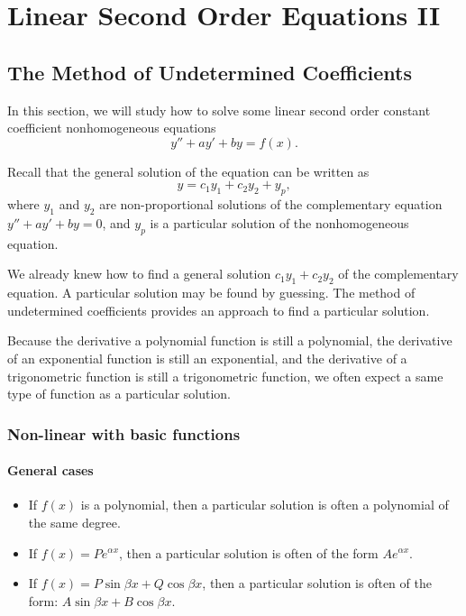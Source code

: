 \chapter{Linear Second Order Equations II}

\section{The Method of Undetermined Coefficients}

In this section, we will study how to solve some linear second order constant coefficient nonhomogeneous equations
\[y''+ay'+by=f(x).\]

Recall that the general solution of the equation can be written as
$$y=c_1y_1+c_2y_2+y_p,$$
where $y_1$ and $y_2$ are non-proportional solutions of the complementary equation $y''+ay'+by=0$, and $y_p$ is a particular solution of the nonhomogeneous equation.

We already knew how to find a general solution $c_1y_1+c_2y_2$ of the complementary equation. A particular solution may be found by guessing. The method of undetermined coefficients provides an approach to find a particular solution.

Because the derivative a polynomial function is still a polynomial, the derivative of an exponential function is still an exponential, and the derivative of a trigonometric function is still a trigonometric function, we often expect a same type of function as a particular solution.  

\subsection{Non-linear with basic functions}

\subsubsection{General cases}

\begin{itemize}
  \item If $f(x)$ is a polynomial, then a particular solution is often a polynomial of the same degree.
  \item If $f(x)=Pe^{\alpha x}$, then a particular solution is often of the form $Ae^{\alpha x}$.
  \item If $f(x)=P\sin\beta x + Q\cos\beta x$, then a particular solution is often of the form: $A\sin\beta x+B\cos\beta x$.
\end{itemize}

